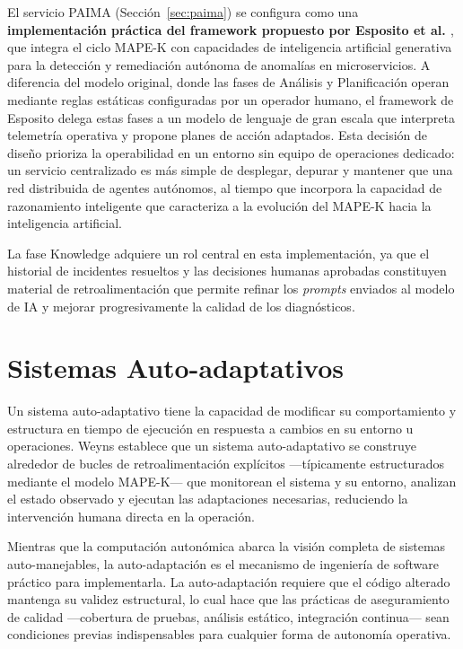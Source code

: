 El servicio PAIMA (Secci\'{o}n~\ref{sec:paima}) se configura como una \textbf{implementaci\'{o}n pr\'{a}ctica del framework propuesto por Esposito et al. \cite{esposito2025mapek}}, que integra el ciclo MAPE-K con capacidades de inteligencia artificial generativa para la detecci\'{o}n y remediaci\'{o}n aut\'{o}noma de anomal\'{i}as en microservicios. A diferencia del modelo original, donde las fases de An\'{a}lisis y Planificaci\'{o}n operan mediante reglas est\'{a}ticas configuradas por un operador humano, el framework de Esposito delega estas fases a un modelo de lenguaje de gran escala que interpreta telemetr\'{i}a operativa y propone planes de acci\'{o}n adaptados. Esta decisi\'{o}n de dise\~{n}o prioriza la operabilidad en un entorno sin equipo de operaciones dedicado: un servicio centralizado es m\'{a}s simple de desplegar, depurar y mantener que una red distribuida de agentes aut\'{o}nomos, al tiempo que incorpora la capacidad de razonamiento inteligente que caracteriza a la evoluci\'{o}n del MAPE-K hacia la inteligencia artificial.

La fase Knowledge adquiere un rol central en esta implementaci\'{o}n, ya que el historial de incidentes resueltos y las decisiones humanas aprobadas constituyen material de retroalimentaci\'{o}n que permite refinar los \textit{prompts} enviados al modelo de IA y mejorar progresivamente la calidad de los diagn\'{o}sticos.

\section{Sistemas Auto-adaptativos}

Un sistema auto-adaptativo tiene la capacidad de modificar su comportamiento y estructura en tiempo de ejecuci\'{o}n en respuesta a cambios en su entorno u operaciones. Weyns \cite{weyns2013software} establece que un sistema auto-adaptativo se construye alrededor de bucles de retroalimentaci\'{o}n expl\'{i}citos ---t\'{i}picamente estructurados mediante el modelo MAPE-K--- que monitorean el sistema y su entorno, analizan el estado observado y ejecutan las adaptaciones necesarias, reduciendo la intervenci\'{o}n humana directa en la operaci\'{o}n.

Mientras que la computaci\'{o}n auton\'{o}mica abarca la visi\'{o}n completa de sistemas auto-manejables, la auto-adaptaci\'{o}n es el mecanismo de ingenier\'{i}a de software pr\'{a}ctico para implementarla. La auto-adaptaci\'{o}n requiere que el c\'{o}digo alterado mantenga su validez estructural, lo cual hace que las pr\'{a}cticas de aseguramiento de calidad ---cobertura de pruebas, an\'{a}lisis est\'{a}tico, integraci\'{o}n continua--- sean condiciones previas indispensables para cualquier forma de autonom\'{i}a operativa.

